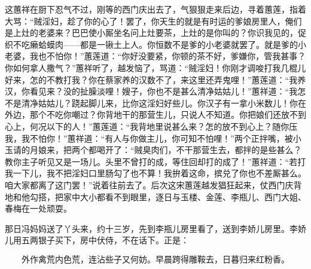 这蕙祥在厨下忍气不过，刚等的西门庆出去了，气狠狠走来后边，寻着蕙莲，指着大骂：“贼淫妇，趁了你的心了！罢了，你天生的就是有时运的爹娘房里人，俺们是上灶的老婆来？巴巴使小厮坐名问上灶要茶，上灶的是你叫的？你识我见的，促织不吃癞蛤蟆肉——都是一锹土上人。你恒数不是爹的小老婆就罢了。就是爹的小老婆，我也不怕你！”蕙莲道：“你好没要紧，你顿的茶不好，爹嫌你，管我甚事？你如何拿人撒气？”蕙祥听了，越发恼了，骂道：“贼淫妇！你刚才调唆打我几棍儿好来，怎的不教打我？你在蔡家养的汉数不了，来这里还弄鬼哩！”蕙莲道：“我养汉，你看见来？没的扯臊淡哩！嫂子，你也不是甚么清净姑姑儿！”蕙祥道：“我怎不是清净姑姑儿？跷起脚儿来，比你这淫妇好些儿。你汉子有一拿小米数儿！你在外边，那个不吃你嘲过？你背地干的那营生儿，只说人不知道。你把娘们还放不到心上，何况以下的人！”蕙莲道：“我背地里说甚么来？怎的放不到心上？随你压我，我不怕你！”蕙祥道：“有人与你做主儿，你可知不怕哩！”两个正拌嘴，被小玉请的月娘来，把两个都喝开了：“贼臭肉们，不干那营生去，都拌的是些甚么？教你主子听见又是一场儿。头里不曾打的成，等住回却打的成了！”蕙祥道：“若打我一下儿，我不把淫妇口里肠勾了也不算！我拚着这命，摈兑了你也不差厮甚么。咱大家都离了这门罢！”说着往前去了。后次这宋蕙莲越发猖狂起来，仗西门庆背地和他勾搭，把家中大小都看不到眼里，逐日与玉楼、金莲、李瓶儿、西门大姐、春梅在一处顽耍。

那日冯妈妈送了丫头来，约十三岁，先到李瓶儿房里看了，送到李娇儿房里。李娇儿用五两银子买下，房中伏侍，不在话下。正是：

\[
外作禽荒内色荒，连沾些子又何妨。
早晨跨得雕鞍去，日暮归来红粉香。
\]
